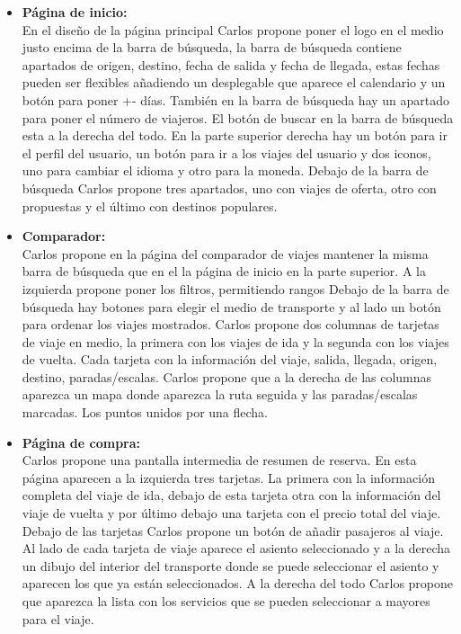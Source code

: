 \begin{itemize}
      \item\textbf{Página de inicio:} \\ En el diseño de la página principal Carlos propone poner el logo en el medio justo encima de la barra de búsqueda, la barra de búsqueda contiene apartados de origen, destino, fecha de salida y fecha de llegada, estas fechas pueden ser flexibles añadiendo un desplegable que aparece el calendario y un botón para poner +- días. También en la barra de búsqueda hay un apartado para poner el número de viajeros.
            El botón de buscar en la barra de búsqueda esta a la derecha del todo.
            En la parte superior derecha hay un botón para ir el perfil del usuario, un botón para ir a los viajes del usuario y dos iconos, uno para cambiar el idioma y otro para la moneda.
            Debajo de la barra de búsqueda Carlos propone tres apartados, uno con viajes de oferta, otro con propuestas y el último con destinos populares.

      \item\textbf{Comparador:} \\ Carlos propone en la página del comparador de viajes mantener la misma barra de búsqueda que en el la página de inicio en la parte superior.
            A la izquierda propone poner los filtros, permitiendo rangos
            Debajo de la barra de búsqueda hay botones para elegir el medio de transporte y al lado un botón para ordenar los viajes mostrados.
            Carlos propone dos columnas de tarjetas de viaje en medio, la primera con los viajes de ida y la segunda con los viajes de vuelta.
            Cada tarjeta con la información del viaje, salida, llegada, origen, destino, paradas/escalas.
            Carlos propone que a la derecha de las columnas aparezca un mapa donde aparezca la ruta seguida y las paradas/escalas marcadas. Los puntos unidos por una flecha.

      \item\textbf{Página de compra:} \\ Carlos propone una pantalla intermedia de resumen de reserva.
            En esta página aparecen a la izquierda tres tarjetas. La primera con la información completa del viaje de ida, debajo de esta tarjeta otra con la información del viaje de vuelta y por último debajo una tarjeta con el precio total del viaje.
            Debajo de las tarjetas Carlos propone un botón de añadir pasajeros al viaje.
            Al lado de cada tarjeta de viaje aparece el asiento seleccionado y a la derecha un dibujo del interior del transporte donde se puede seleccionar el asiento y aparecen los que ya están seleccionados.
            A la derecha del todo Carlos propone que aparezca la lista con los servicios que se pueden seleccionar a mayores para el viaje.


\end{itemize}
